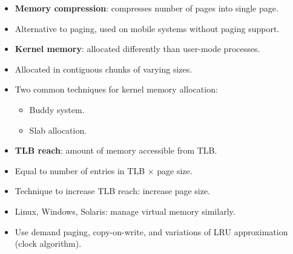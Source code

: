 \begin{itemize}
    \item \textbf{Memory compression}: compresses number of pages into single page.
    \item Alternative to paging, used on mobile systems without paging support.
    \item \textbf{Kernel memory}: allocated differently than user-mode processes.
    \item Allocated in contiguous chunks of varying sizes.
    \item Two common techniques for kernel memory allocation:
    \begin{itemize}
        \item Buddy system.
        \item Slab allocation.
    \end{itemize}
    \item \textbf{TLB reach}: amount of memory accessible from TLB.
    \item Equal to number of entries in TLB $\times$ page size.
    \item Technique to increase TLB reach: increase page size.
    \item Linux, Windows, Solaris: manage virtual memory similarly.
    \item Use demand paging, copy-on-write, and variations of LRU approximation (clock algorithm).
\end{itemize}
